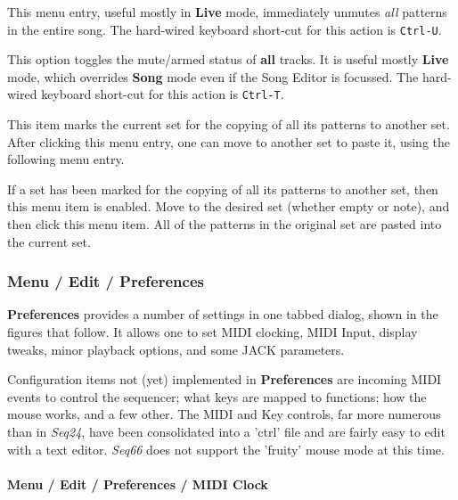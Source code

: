    This menu entry, useful mostly in \textbf{Live} mode,
   immediately unmutes \textsl{all} patterns in the entire song.
   The hard-wired keyboard short-cut for this action is \texttt{Ctrl-U}.

   This option toggles the mute/armed status of \textbf{all} tracks.
   It is useful mostly \textbf{Live} mode, which overrides \textbf{Song}
   mode even if the Song Editor is focussed.
   The hard-wired keyboard short-cut for this action is \texttt{Ctrl-T}.

   This item marks the current set for the copying of all its patterns to
   another set.
   After clicking this menu entry, one can move to another set to paste it,
   using the following menu entry.

   If a set has been marked for the copying of all its patterns to
   another set, then this menu item is enabled.
   Move to the desired set (whether empty or note), and then
   click this menu item.
   All of the patterns in the original set are pasted into the current set.

\subsubsection{Menu / Edit / Preferences}
\label{subsubsec:menu_edit_preferences}

   \textbf{Preferences} provides a number of settings in one
   tabbed dialog, shown in the figures that follow.
   It allows one to set MIDI clocking, MIDI Input, display tweaks, minor
   playback options, and some JACK parameters.

  Configuration items not (yet) implemented in \textbf{Preferences} are
      incoming MIDI events to control the sequencer;
      what keys are mapped to functions;
      how the mouse works, and a few other.
   The MIDI and Key controls, far more numerous than in \textsl{Seq24}, have
   been consolidated into a 'ctrl' file and are fairly easy to edit with a text
   editor.
   \textsl{Seq66} does not support the 'fruity' mouse mode at this time.

\paragraph{Menu / Edit / Preferences / MIDI Clock}
\label{paragraph:menu_edit_preferences_midi_clock}

